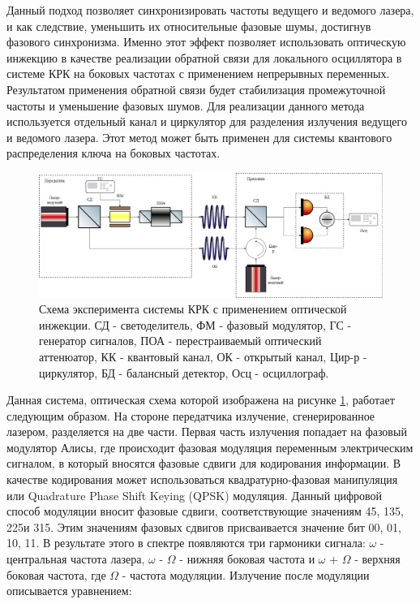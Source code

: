 Данный подход позволяет синхронизировать частоты ведущего и ведомого лазера, и как следствие, уменьшить их относительные фазовые шумы, достигнув фазового синхронизма. Именно этот эффект позволяет использовать оптическую инжекцию в качестве реализации обратной связи для локального осциллятора в системе КРК на боковых частотах с применением непрерывных переменных. Результатом применения обратной связи будет стабилизация промежуточной частоты и уменьшение фазовых шумов. Для реализации данного метода используется отдельный канал и циркулятор для разделения излучения ведущего и ведомого лазера. 
Этот метод может быть применен для системы квантового распределения ключа на боковых частотах.
\begin{figure}
    \centering
    \includegraphics[width=\textwidth]{images/Схема с обратной связью.png}
    \caption{Схема эксперимента системы КРК с применением оптической инжекции. СД - светоделитель, ФМ - фазовый модулятор, ГС - генератор сигналов, ПОА - перестраиваемый оптический аттенюатор, КК - квантовый канал, ОК - открытый канал, Цир-р - циркулятор, БД - балансный детектор, Осц - осциллограф.}
    \label{fig:opt inj scheme}
\end{figure}
Данная система, оптическая схема которой изображена на рисунке \ref{fig:opt inj scheme}, работает следующим образом. На стороне передатчика излучение, сгенерированное лазером, разделяется на две части. Первая часть излучения попадает на фазовый модулятор Алисы, где происходит фазовая модуляция переменным электрическим сигналом, в который вносятся фазовые сдвиги для кодирования информации. В качестве кодирования может использоваться квадратурно-фазовая манипуляция или Quadrature Phase Shift Keying (QPSK) модуляция. Данный цифровой способ модуляции вносит фазовые сдвиги, соответствующие значениям 45\textdegree, 135\textdegree, 225\textdegree и 315\textdegree. Этим значениям фазовых сдвигов присваивается значение бит {00, 01, 10, 11}. В результате этого в спектре появляются три гармоники сигнала: $\omega$ - центральная частота лазера, $\omega$ - $\Omega$ - нижняя боковая частота  и $\omega$ + $\Omega$ - верхняя боковая частота, где $\Omega$ - частота модуляции. Излучение после модуляции описывается уравнением: 
